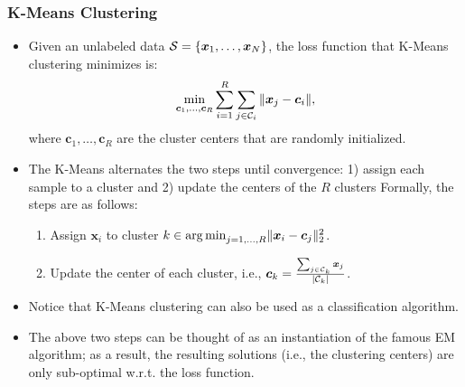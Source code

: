     \subsubsection{K-Means Clustering}
        \begin{itemize}
             
            \item Given an unlabeled data $\mathcal{S}=\{ \bm{x}_1, \ldots, \bm{x}_N \}$, the loss function that K-Means clustering minimizes is:
            \begin{equation}
                \min_{\bm{c}_1, \ldots, \bm{c}_R} \sum_{i=1}^{R}{
                    \sum_{j \in \mathcal{C}_i}^{}{\lVert\bm{x}_j - \bm{c}_i\rVert}
                },
            \end{equation}
            where $\bm{c}_1, \ldots, \bm{c}_R$ are the cluster centers that are  randomly initialized.
            
            \item The K-Means alternates the two steps until convergence: 1) assign each sample to a cluster and 2) update the centers of the $R$ clusters
            Formally, the steps are as follows:
            \begin{enumerate}
                \item Assign $\bm{x}_i$ to cluster $k \in \operatorname{arg\,min}_{j=1,\ldots, R}\lVert\bm{x}_i - \bm{c}_j\rVert_2^2$.
                \item Update the center of each cluster, i.e., $\bm{c}_k = \frac{\sum_{j \in \mathcal{C}_k}^{}{\bm{x}_j}}{| \mathcal{C}_k |}$.
            \end{enumerate}
            \item Notice that K-Means clustering can also be used as a classification algorithm. 
            \item The above two steps can be thought of as an instantiation of the famous EM algorithm; as a result, the resulting solutions (i.e., the clustering centers) are only sub-optimal w.r.t. the loss function.
        \end{itemize}
    
